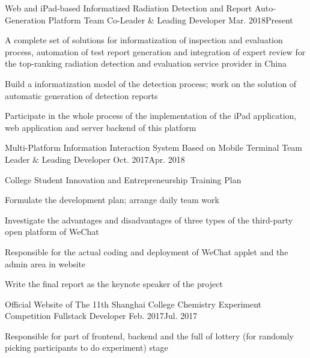 
\begin{projitem}
    {Web and iPad-based Informatized Radiation Detection and Report Auto-Generation Platform}
    {Team Co-Leader \& Leading Developer}
    {Mar. 2018}{Present}
    \item A complete set of solutions for informatization of inspection
          and evaluation process, automation of test report generation and
          integration of expert review for the top-ranking radiation detection
          and evaluation service provider in China
    \item Build a informatization model of the detection process;
          work on the solution of automatic generation of detection reports
    \item Participate in the whole process of the implementation of the iPad application, web application and server backend of this platform
\end{projitem}

\begin{projitem}
    {Multi-Platform Information Interaction System Based on Mobile Terminal}
    {Team Leader \& Leading Developer}
    {Oct. 2017}{Apr. 2018}
    \item College Student Innovation and Entrepreneurship Training Plan
    \item Formulate the development plan; arrange daily team work
    \item Investigate the advantages and disadvantages of three types of the third-party open platform of WeChat
    \item Responsible for the actual coding and deployment of WeChat applet and the admin area in website
    \item Write the final report as the keynote speaker of the project
\end{projitem}

\begin{projitem}
    {Official Website of The 11th Shanghai College Chemistry Experiment Competition}
    {Fullstack Developer}
    {Feb. 2017}{Jul. 2017}
    \item Responsible for part of frontend, backend and the full of lottery (for randomly picking participants to do experiment) stage
\end{projitem}

\endinput